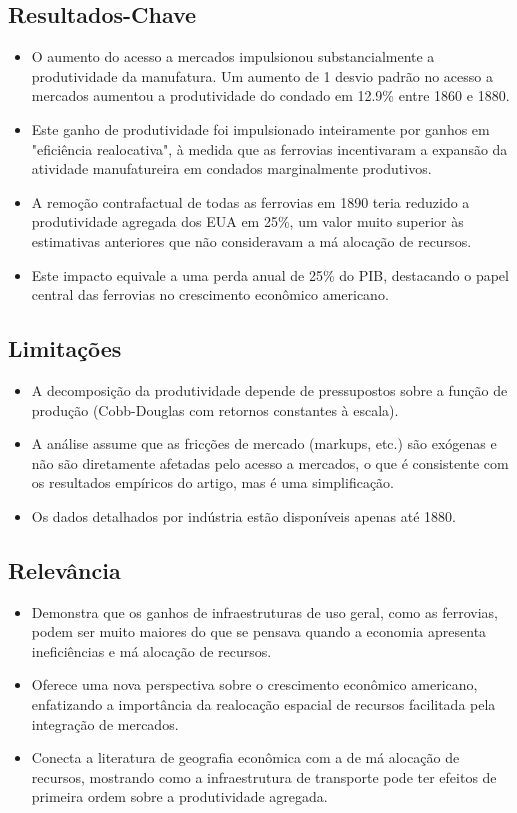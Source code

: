 \documentclass[12pt]{article}
\begin{document}
\subsection*{Resultados-Chave}
\begin{itemize}
    \item O aumento do acesso a mercados impulsionou substancialmente a produtividade da manufatura. Um aumento de 1 desvio padrão no acesso a mercados aumentou a produtividade do condado em 12.9\% entre 1860 e 1880.
    \item Este ganho de produtividade foi impulsionado inteiramente por ganhos em "eficiência realocativa", à medida que as ferrovias incentivaram a expansão da atividade manufatureira em condados marginalmente produtivos.
    \item A remoção contrafactual de todas as ferrovias em 1890 teria reduzido a produtividade agregada dos EUA em 25\%, um valor muito superior às estimativas anteriores que não consideravam a má alocação de recursos.
    \item Este impacto equivale a uma perda anual de 25\% do PIB, destacando o papel central das ferrovias no crescimento econômico americano.
\end{itemize}

\subsection*{Limitações}
\begin{itemize}
    \item A decomposição da produtividade depende de pressupostos sobre a função de produção (Cobb-Douglas com retornos constantes à escala).
    \item A análise assume que as fricções de mercado (markups, etc.) são exógenas e não são diretamente afetadas pelo acesso a mercados, o que é consistente com os resultados empíricos do artigo, mas é uma simplificação.
    \item Os dados detalhados por indústria estão disponíveis apenas até 1880.
\end{itemize}

\subsection*{Relevância}
\begin{itemize}
    \item Demonstra que os ganhos de infraestruturas de uso geral, como as ferrovias, podem ser muito maiores do que se pensava quando a economia apresenta ineficiências e má alocação de recursos.
    \item Oferece uma nova perspectiva sobre o crescimento econômico americano, enfatizando a importância da realocação espacial de recursos facilitada pela integração de mercados.
    \item Conecta a literatura de geografia econômica com a de má alocação de recursos, mostrando como a infraestrutura de transporte pode ter efeitos de primeira ordem sobre a produtividade agregada.
\end{itemize}
\newpage
\end{document}
